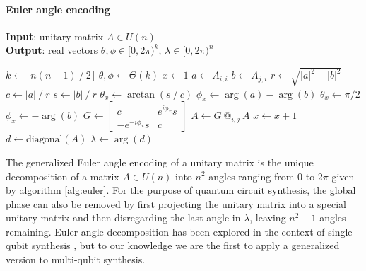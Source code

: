 \documentclass[letterpaper]{article} %
\begin{document}
\paragraph{Euler angle encoding}

\begin{algorithm}[tb]
    \caption{
        Procedure for Euler angle encoding of a unitary matrix $A$.
        Here $\Theta(k)$ represents initialization of an all zero array of size $k$,
        the operator $X ~@_{i,j}~ Y$ represents the block multiplication
        of a $2 \times 2$ matrix $X$ along rows $i,j$ of matrix $Y$,
        and the `diagonal' function selects the diagonal elements of a matrix.
    }

    \label{alg:euler}

    \textbf{Input}: unitary matrix $A \in U(n)$ \\
    \textbf{Output}: real vectors $\theta,\phi \in [0, 2\pi)^k$, $\lambda \in [0, 2\pi)^n$

    \begin{algorithmic}[1]
        \STATE $k \gets \lfloor n(n-1)~/~2 \rfloor$
        \STATE $\theta, \phi \gets \Theta(k)$
        \STATE $x \gets 1$ 
                \STATE $a \gets A_{i,i}$
                \STATE $b \gets A_{j,i}$
                    \STATE $r \gets \sqrt{|a|^2+|b|^2}$
                    \STATE $c \gets |a| ~/~ r$
                    \STATE $s \gets |b| ~/~ r$
                        \STATE $\theta_x \gets \arctan (s~/~c)$
                        \STATE $\phi_x \gets \arg (a) - \arg (b)$
                    \ELSE
                        \STATE $\theta_x \gets \pi/2$
                        \STATE $\phi_x \gets - \arg (b)$
                    \ENDIF
                    \STATE $G \gets \begin{bmatrix} c & e^{i\phi_x}s \\ -e^{-i\phi_x}s & c \end{bmatrix}$
                    \STATE $A \gets G ~@_{i,j}~ A$
                \ENDIF
                \STATE $x \gets x + 1$
            \ENDFOR
        \ENDFOR
        \STATE $d \gets \text{diagonal}(A)$
        \STATE $\lambda \gets \arg(d)$
    \end{algorithmic}
\end{algorithm}

The generalized Euler angle encoding \cite{diaconis2017hurwitz} of a unitary matrix is the unique decomposition
of a matrix $A \in U(n)$ into $n^2$ angles ranging from $0$ to $2\pi$ given by algorithm \ref{alg:euler}.
For the purpose of quantum circuit synthesis, the global phase can also be removed by first projecting the unitary
matrix into a special unitary matrix and then disregarding the last angle in $\lambda$, leaving $n^2-1$ angles remaining.
Euler angle decomposition has been explored in the context of single-qubit synthesis \cite{alam2023quantum},
but to our knowledge we are the first to apply a generalized version to multi-qubit synthesis.
\end{document}
